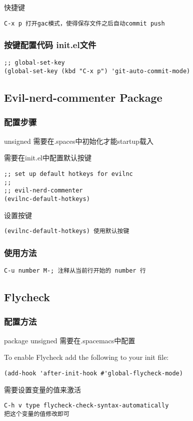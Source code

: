 \documentclass[11pt]{article}
\begin{document}
快捷键
\begin{verbatim}
C-x p 打开gac模式，使得保存文件之后自动commit push
\end{verbatim}
\subsubsection{按键配置代码 init.el文件}
\label{sec:orgb332327}
\begin{verbatim}
;; global-set-key
(global-set-key (kbd "C-x p") 'git-auto-commit-mode)
\end{verbatim}
\subsection{Evil-nerd-commenter Package}
\label{sec:orgd578406}
\subsubsection{配置步骤}
\label{sec:org244e717}
unsigned 需要在.spaces中初始化才能startup载入

需要在init.el中配置默认按键
\begin{verbatim}
;; set up default hotkeys for evilnc
;;
;; evil-nerd-commenter
(evilnc-default-hotkeys)
\end{verbatim}
设置按键
\begin{verbatim}
(evilnc-default-hotkeys) 使用默认按键
\end{verbatim}
\subsubsection{使用方法}
\label{sec:org103e932}
\begin{verbatim}
C-u number M-; 注释从当前行开始的 number 行
\end{verbatim}
\subsection{Flycheck}
\label{sec:orga45ff81}
\subsubsection{配置方法}
\label{sec:org36bb828}
package unsigned 需要在.spacemacs中配置

To enable Flycheck add the following to your init file:
\begin{verbatim}
(add-hook 'after-init-hook #'global-flycheck-mode)
\end{verbatim}
需要设置变量的值来激活
\begin{verbatim}
C-h v type flycheck-check-syntax-automatically
把这个变量的值修改即可
\end{verbatim}
\end{document}
